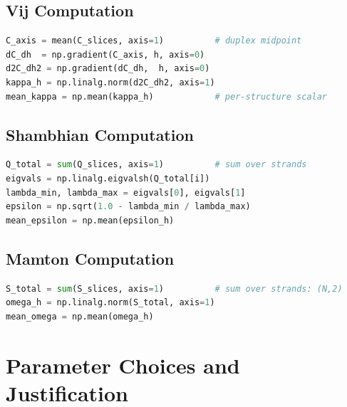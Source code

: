 \subsection{Vij Computation}

\begin{lstlisting}[language=Python, caption=Vij (curvature) from axis centroid]
C_axis = mean(C_slices, axis=1)          # duplex midpoint
dC_dh  = np.gradient(C_axis, h, axis=0)
d2C_dh2 = np.gradient(dC_dh,  h, axis=0)
kappa_h = np.linalg.norm(d2C_dh2, axis=1)
mean_kappa = np.mean(kappa_h)            # per-structure scalar
\end{lstlisting}

\subsection{Shambhian Computation}

\begin{lstlisting}[language=Python, caption=Shambhian (eccentricity) from Q eigenvalues]
Q_total = sum(Q_slices, axis=1)          # sum over strands
eigvals = np.linalg.eigvalsh(Q_total[i])
lambda_min, lambda_max = eigvals[0], eigvals[1]
epsilon = np.sqrt(1.0 - lambda_min / lambda_max)
mean_epsilon = np.mean(epsilon_h)
\end{lstlisting}

\subsection{Mamton Computation}

\begin{lstlisting}[language=Python, caption=Mamton (skewness) from 3rd-order moments]
S_total = sum(S_slices, axis=1)          # sum over strands: (N,2)
omega_h = np.linalg.norm(S_total, axis=1)
mean_omega = np.mean(omega_h)
\end{lstlisting}

\section{Parameter Choices and Justification}

